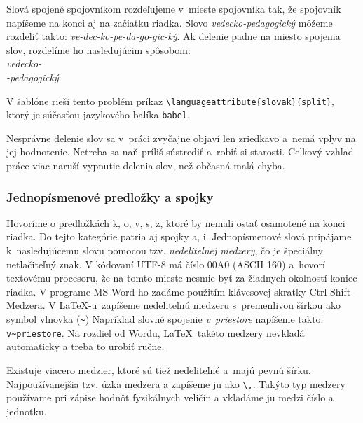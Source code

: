 \documentclass[../../../thesis.tex]{subfiles}
\begin{document}
Slová spojené spojovníkom rozdeľujeme v~mieste spojovníka tak,
že spojovník napíšeme na konci aj na začiatku riadka.
Slovo \emph{vedecko-pedagogický} môžeme rozdeliť takto:
\emph{ve-dec-ko-pe-da-go-gic-ký}.
Ak delenie padne na miesto spojenia slov,
rozdelíme ho nasledujúcim spôsobom:\\
\indent\emph{vedecko-}\\
\indent\emph{-pedagogický}

V šablóne rieši tento problém príkaz
\verb|\languageattribute{slovak}{split}|,
ktorý je súčasťou jazykového balíka \verb|babel|.

Nesprávne delenie slov sa v~práci zvyčajne objaví
len zriedkavo a~nemá vplyv na jej hodnotenie.
Netreba sa naň príliš sústrediť a~robiť si starosti.
Celkový vzhľad práce viac naruší vypnutie delenia slov,
než občasná malá chyba.

\subsubsection{Jednopísmenové predložky a spojky}
Hovoríme o predložkách k, o, v, s, z,
ktoré by nemali ostať osamotené na konci riadka.
Do tejto kategórie patria aj spojky a, i.
Jednopísmenové slová pripájame k~nasledujúcemu slovu pomocou
tzv. \emph{nedeliteľnej medzery},
čo je špeciálny netlačiteľný znak.
V kódovaní UTF-8 má číslo 00A0 (ASCII 160)
a~hovorí textovému procesoru,
že na tomto mieste nesmie byť za žiadnych okolností
koniec riadka.
V programe MS Word ho zadáme použitím klávesovej skratky
Ctrl-Shift-Medzera.
V \LaTeX-u\ zapíšeme nedeliteľnú medzeru s~premenlivou šírkou
ako symbol vlnovka (\verb|~|)
Napríklad slovné spojenie \emph{v~priestore} napíšeme takto:
\verb|v~priestore|.
Na rozdiel od Wordu, \LaTeX\ takéto medzery nevkladá automaticky
a treba to urobiť ručne.

Existuje viacero medzier, ktoré sú tiež nedeliteľné a~majú pevnú šírku.
Najpoužívanejšia tzv. úzka medzera a zapíšeme ju ako \verb|\,|.
Takýto typ medzery používame pri zápise hodnôt fyzikálnych veličín a vkladáme ju medzi číslo a jednotku.
\end{document}
